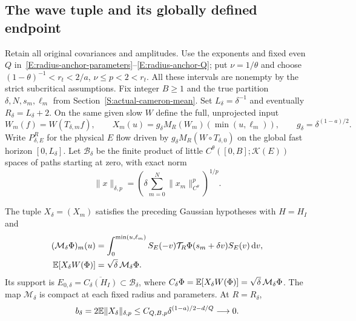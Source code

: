 \subsection{The wave tuple and its globally defined endpoint}

Retain all original covariances and amplitudes. Use the exponents and fixed even
$Q$ in~\eqref{E:radius-anchor-parameters}--\eqref{E:radius-anchor-Q}; put $\nu =
1/\theta$ and choose $(1-\theta)^{-1} < r_t < 2/a$, $\nu \le p < 2 < r_t$. All
these intervals are nonempty by the strict subcritical assumptions. Fix integer
$B \ge 1$ and the true partition $\delta,N,s_m,\ell_m$ from
Section~\ref{S:actual-cameron-mean}. Set $L_\delta = \delta^{-1}$ and eventually
$R_\delta = L_\delta+2$. On the same given slow $W$ define the full, unprojected
input
\begin{equation}\label{E:tube-actual-input}
  W_m(f)=W(T_{\delta,m}f),\qquad
  X_m(u)=g_\delta M_R(W_m)(\min(u,\ell_m)),\qquad
  g_\delta=\delta^{(1-a)/2}.
\end{equation}
Write $P_{\delta,E}^R$ for the physical $E$ flow driven by $g_\delta M_R(W\circ
T_{\delta,0})$ on the global fast horizon $[0,L_\delta]$. Let
$\mathscr{B}_\delta$ be the finite product of little
$C^\theta([0,B];\mathcal{K}(E))$ spaces of paths starting at zero, with exact
norm
\[
  \|x\|_{\delta,p}=\left(\delta\sum_{m=0}^N
  \|x_m\|_{C^\theta}^p\right)^{1/p}.
\]

\begin{proposition}\label{P:tube-actual-law}
  The tuple $X_\delta = (X_m)$ satisfies the preceding Gaussian hypotheses with
  $H = H_I$ and
  \begin{align}
    (\mathcal{M}_\delta\Phi)_m(u)
    &=\int_0^{\min(u,\ell_m)}
    S_E(-v)\mathcal{T}_R\Phi(s_m+\delta v)S_E(v)\,\mathrm{d} v,
    \label{E:tube-actual-mean}\\
    \mathbb{E}[X_\delta W(\Phi)]&=\sqrt\delta\,\mathcal{M}_\delta\Phi .
    \label{E:tube-actual-covariance}
  \end{align}
  Its support is $E_{0,\delta} = \overline{C_\delta(H_I)} \subset
  \mathscr{B}_\delta$, where $C_\delta\Phi = \mathbb{E}[X_\delta W(\Phi)] =
  \sqrt\delta\,\mathcal{M}_\delta\Phi$. The map $\mathcal{M}_\delta$ is compact
  at each fixed radius and parameters. At $R = R_\delta$,
  \begin{equation}\label{E:tube-typical-radius}
    b_\delta=2\mathbb{E}\|X_\delta\|_{\delta,p}
    \le C_{Q,B,p}\delta^{(1-a)/2-d/Q}\longrightarrow0 .
  \end{equation}
\end{proposition}

